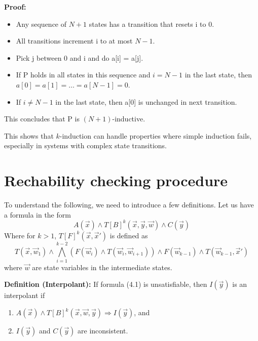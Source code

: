 \vspace{\baselineskip}\noindent \textbf{Proof:}
\begin{itemize}
    \item Any sequence of $N+1$ states has a transition that resets i to 0.

\item All transitions increment i to at most $N - 1$.

\item Pick j between 0 and i and do a[i] = a[j].

\item If P holds in all states in this sequence and $i = N - 1$ in the last state, then $a[0]=a[1]=\dots=a[N-1]=0$.

\item If $i \neq N - 1$ in the last state, then a[0] is unchanged in next transition.
\end{itemize}
\noindent This concludes that P is $(N + 1)$-inductive.

\hfill\square


\vspace{\baselineskip}This shows that \( k \)-induction can handle properties where simple induction fails, especially in systems with complex state transitions.

\section{Rechability checking procedure}\label{ReachabilityChecking}

\noindent To understand the following, we need to introduce a few definitions.
Let us have a formula in the form 
\begin{equation}
    A(\vec{x}) \wedge T[B]^k(\vec{x},\vec{y},\vec{w}) \wedge C(\vec{y})
\end{equation}
Where for \( k > 1 \), \( T[F]^k(\vec{x}, \vec{x}') \) is defined as
\begin{equation*}
    T(\vec{x}, \vec{w}_1) \land \bigwedge_{i=1}^{k-2} \left( F(\vec{w}_i) \land T(\vec{w}_i, \vec{w}_{i+1}) \right) \land F(\vec{w}_{k-1}) \land T(\vec{w}_{k-1}, \vec{x}')
\end{equation*}
where $\vec{w}$ are state variables in the intermediate states.


\vspace{\baselineskip}\noindent    \textbf{Definition (Interpolant)\cite{7886665}:} If formula (4.1) is unsatisfiable, then $I(\vec{y})$ is an interpolant if
    \begin{enumerate}
       \item \( A(\vec{x}) \land T[B]^k(\vec{x}, \vec{w}, \vec{y}) \Rightarrow I(\vec{y}) \), and
       \item \( I(\vec{y}) \) and \( C(\vec{y}) \) are inconsistent.
\end{enumerate}

